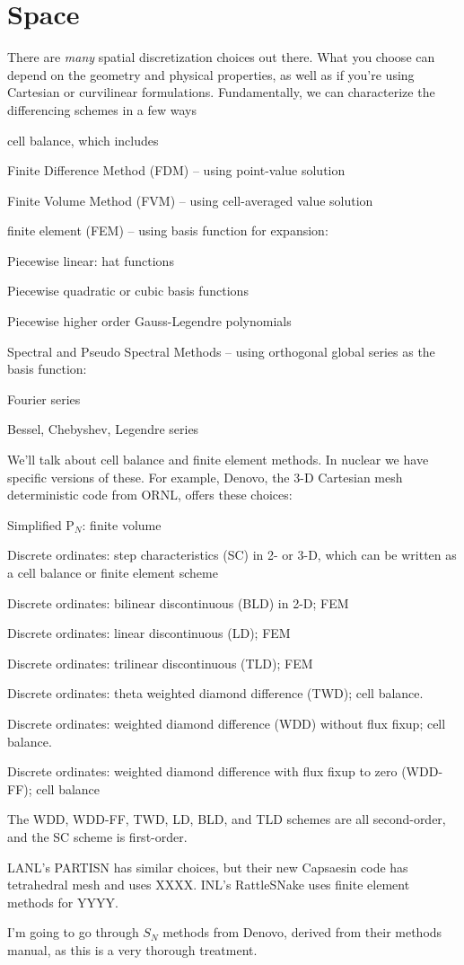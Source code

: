 \documentclass[12pt]{article}
\begin{document}
\section*{Space}
There are \textit{many} spatial discretization choices out there. What you choose can depend on the geometry and physical properties, as well as if you're using Cartesian or curvilinear formulations. Fundamentally, we can characterize the differencing schemes in a few ways
\begin{compactitem}
\item cell balance, which includes
  \begin{compactitem}
  \item Finite Difference Method (FDM) -- using point-value solution	
  \item Finite Volume Method (FVM) -- using cell-averaged value solution
  \end{compactitem}	
\item finite element (FEM) -- using basis function for expansion:	
  \begin{compactitem}
  \item Piecewise linear: hat functions	
  \item Piecewise quadratic or cubic basis functions	
  \item Piecewise higher order Gauss-Legendre polynomials	
  \end{compactitem}
\item Spectral and Pseudo Spectral Methods -- using orthogonal global series as the basis function:	
  \begin{compactitem}
  \item Fourier series	
  \item Bessel, Chebyshev, Legendre series
  \end{compactitem}
\end{compactitem}

We'll talk about cell balance and finite element methods. In nuclear we have specific versions of these. For example, Denovo, the 3-D Cartesian mesh deterministic code from ORNL, offers these choices:
\begin{compactitem}
\item Simplified P$_N$: finite volume 
\item Discrete ordinates: step characteristics (SC) in 2- or 3-D, which can be written as a cell balance or finite element scheme
\item Discrete ordinates: bilinear discontinuous (BLD) in 2-D; FEM
\item Discrete ordinates: linear discontinuous (LD); FEM 
\item Discrete ordinates: trilinear discontinuous (TLD); FEM
\item Discrete ordinates: theta weighted diamond difference (TWD); cell balance.
\item Discrete ordinates: weighted diamond difference (WDD) without flux fixup; cell balance.
\item Discrete ordinates: weighted diamond difference with flux fixup to zero (WDD-FF); cell balance
\end{compactitem}
The WDD, WDD-FF, TWD, LD, BLD, and TLD schemes are all second-order, and the SC scheme is first-order.

LANL's PARTISN has similar choices, but their new Capsaesin code has tetrahedral mesh and uses XXXX. INL's RattleSNake uses finite element methods for YYYY.

I'm going to go through $S_N$ methods from Denovo, derived from their methods manual, as this is a very thorough treatment. 
\end{document}
